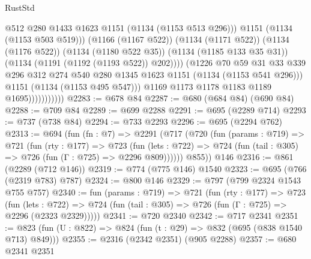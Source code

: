 \begin{lexlean}{RustStd}
\begin{coremodule}
                                    @512
                                    @280
                                    @1433
                                    @1623
                                    @1151
                                    (@1134 (@1153 @513 @296)))
                                  @1151
                                  (@1134 (@1153 @503 @519)))
                                (@1166 (@1167 @522))
                                (@1134 (@1171 @522))
                                (@1134 (@1176 @522))
                                (@1134 (@1180 @522 @35))
                                (@1134 (@1185 @133 @35 @31))
                                (@1134 (@1191 (@1192 (@1193 @522)) @202))))
                            (@1226
                              @70
                              @59
                              @31
                              @33
                              @339
                              @296
                              @312
                              @274
                              @540
                              @280
                              @1345
                              @1623
                              @1151
                              (@1134 (@1153 @541 @296)))
                            @1151
                            (@1134 (@1153 @495 @547)))
                          @1169
                          @1173
                          @1178
                          @1183
                          @1189
                          @1695)))))))))))
@2283 := @678 @84
@2287 := @680 (@684 @84) (@690 @84)
@2288 := @709 @84
@2289 := @699 @2288
@2291 := @695 (@2289 @714)
@2293 := @737 (@738 @84)
@2294 := @733 @2293
@2296 := @695 (@2294 @762)
@2313 := @694
    (fun (fn : @7) =>
    @2291
      (@717
        (@720
          (fun (params : @719) =>
          @721
            (fun (rty : @177) =>
            @723
              (fun (lets : @722) =>
              @724 (fun (tail : @305) => @726 (fun (Γ : @725) => @2296 @809))))))
        @855))
    @146
@2316 := @861 (@2289 (@712 @146))
@2319 := @774 (@775 @146) @1540
@2323 := @695 (@766 (@2319 @783) @787)
@2324 := @800 @146
@2329 := @797 (@799 @2324 @1543 @755 @757)
@2340 := fun (params : @719) =>
  @721
    (fun (rty : @177) =>
    @723
      (fun (lets : @722) =>
      @724 (fun (tail : @305) => @726 (fun (Γ : @725) => @2296 (@2323 @2329)))))
@2341 := @720 @2340
@2342 := @717 @2341
@2351 := @823 (fun (U : @822) => @824 (fun (t : @29) => @832 (@695 (@838 @1540 @713) @849)))
@2355 := @2316 (@2342 @2351) (@905 @2288)
@2357 := @680 @2341 @2351

\end{coremodule}
\end{lexlean}
